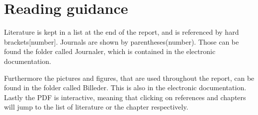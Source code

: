 \documentclass[../../main]{subfiles}
\begin{document}
\section{Reading guidance}

Literature is kept in a list at the end of the report, and is referenced by hard brackets[number].
Journals are shown by parentheses(number).
Those can be found the folder called Journaler, which is contained in the electronic documentation.

Furthermore the pictures and figures, that are used throughout the report, can be found in the folder called Billeder. This is also in the electronic documentation.
Lastly the PDF is interactive, meaning that clicking on references and chapters will jump to the list of literature or the chapter respectively.

\end{document}
